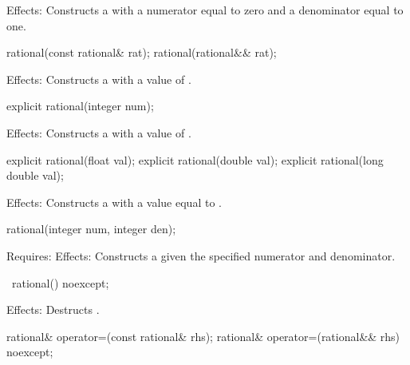 \begin{itemdescr}
Effects: Constructs a  with a numerator equal to zero and a denominator equal to one.
\end{itemdescr}

\begin{itemdecl}
rational(const rational& rat);
rational(rational&& rat);
\end{itemdecl}

\begin{itemdescr}
Effects: Constructs a  with a value of .
\end{itemdescr}

\begin{itemdecl}
explicit rational(integer num);
\end{itemdecl}

\begin{itemdescr}
Effects: Constructs a  with a value of .
\end{itemdescr}

\begin{itemdecl}
explicit rational(float val);
explicit rational(double val);
explicit rational(long double val);
\end{itemdecl}

\begin{itemdescr}
Effects: Constructs a  with a value equal to .
\end{itemdescr}

\begin{itemdecl}
rational(integer num, integer den);
\end{itemdecl}

\begin{itemdescr}
Requires: 
Effects: Constructs a  given the specified numerator and denominator.
\end{itemdescr}

\begin{itemdecl}
~rational() noexcept;
\end{itemdecl}

\begin{itemdescr}
Effects: Destructs .
\end{itemdescr}

\begin{itemdecl}
rational& operator=(const rational& rhs);
rational& operator=(rational&& rhs) noexcept;
\end{itemdecl}

